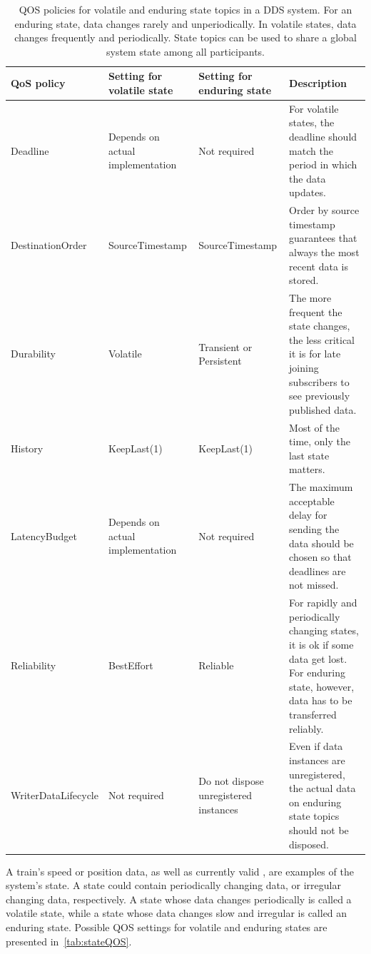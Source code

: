 \begin{table}[htbp!]
	\begin{center}
		\caption{\Gls*{QOS} policies for volatile and enduring state topics in a \gls*{DDS} system. For an enduring state, data changes rarely and unperiodically. In volatile states, data changes frequently and periodically. State topics can be used to share a global system state among all participants.}
		\label{tab:stateQOS}
		\begin{tabularx}{\textwidth}{|X|X|X|X|}
			\hline
			\textbf{QoS policy} & \textbf{Setting for volatile state} & \textbf{Setting for enduring state} & \textbf{Description}\\
			\hline \hline
			Deadline & Depends on actual implementation & Not required & For volatile states, the deadline should match the period in which the data updates. \\
			\hline
			DestinationOrder & SourceTimestamp & SourceTimestamp & Order by source timestamp guarantees that always the most recent data is stored. \\
			\hline
			Durability & Volatile & Transient or Persistent & The more frequent the state changes, the less critical it is for late joining subscribers to see previously published data. \\
			\hline
			History & KeepLast(1) & KeepLast(1) & Most of the time, only the last state matters. \\
			\hline
			LatencyBudget & Depends on actual implementation & Not required & The maximum acceptable delay for sending the data should be chosen so that deadlines are not missed. \\
			\hline
			Reliability & BestEffort & Reliable & For rapidly and periodically changing states, it is ok if some data get lost. For enduring state, however, data has to be transferred reliably. \\
			\hline
			WriterDataLifecycle & Not required & Do not dispose unregistered instances & Even if data instances are unregistered, the actual data on enduring state topics should not be disposed. \\
			\hline
		\end{tabularx}
	\end{center}
\end{table}

A train's speed or position data, as well as currently valid , are examples of the system's state.
A state could contain periodically changing data, or irregular changing data, respectively.
A state whose data changes periodically is called a volatile state, while a state whose data changes slow and irregular is called an enduring state.
Possible \gls*{QOS} settings for volatile and enduring states are presented in~\autoref{tab:stateQOS}.

